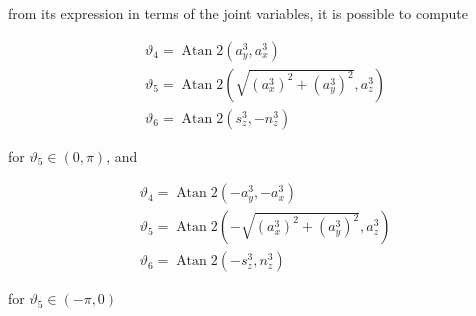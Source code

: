 \documentclass[10pt]{article}
\begin{document}
\noindent
from its expression in terms of the joint variables, it is possible to compute

$$
\begin{aligned}
& \vartheta_{4}=\operatorname{Atan} 2\left(a_{y}^{3}, a_{x}^{3}\right) \\
& \vartheta_{5}=\operatorname{Atan} 2\left(\sqrt{\left(a_{x}^{3}\right)^{2}+\left(a_{y}^{3}\right)^{2}}, a_{z}^{3}\right) \\
& \vartheta_{6}=\operatorname{Atan} 2\left(s_{z}^{3},-n_{z}^{3}\right)
\end{aligned}
$$

\noindent
for $\vartheta_{5} \in(0, \pi)$, and

$$
\begin{aligned}
& \vartheta_{4}=\operatorname{Atan} 2\left(-a_{y}^{3},-a_{x}^{3}\right) \\
& \vartheta_{5}=\operatorname{Atan} 2\left(-\sqrt{\left(a_{x}^{3}\right)^{2}+\left(a_{y}^{3}\right)^{2}}, a_{z}^{3}\right) \\
& \vartheta_{6}=\operatorname{Atan} 2\left(-s_{z}^{3}, n_{z}^{3}\right)
\end{aligned}
$$

\noindent
for $\vartheta_{5} \in(-\pi, 0)$
\end{document}
